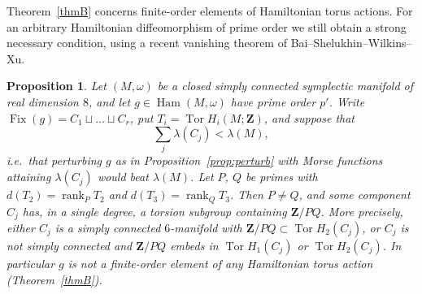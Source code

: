 \documentclass[11pt]{amsart}
\numberwithin{equation}{section}
\newtheorem{proposition}[theorem]{Proposition}
\theoremstyle{definition}
\theoremstyle{remark}
\newcommand{\Z}{\mathbf Z}
\DeclareMathOperator{\Tor}{Tor}
\DeclareMathOperator{\Fix}{Fix}
\DeclareMathOperator{\Ham}{Ham}
\DeclareMathOperator{\rank}{rank}
\begin{document}
Theorem~\ref{thmB} concerns finite-order elements of Hamiltonian torus
actions. For an arbitrary Hamiltonian diffeomorphism of prime order we
still obtain a strong necessary condition, using a recent vanishing
theorem of Bai--Shelukhin--Wilkins--Xu.

\begin{proposition}\label{prop:primeorder}
Let $(M,\omega)$ be a closed simply connected symplectic manifold of real
dimension $8$, and let $g\in\Ham(M,\omega)$ have prime order $p'$. Write
$\Fix(g)=C_1\sqcup\dots\sqcup C_r$, put $T_i=\Tor H_i(M;\Z)$, and suppose
that
\[
 \sum_j\lambda(C_j)<\lambda(M),
\]
i.e.\ that perturbing $g$ as in Proposition~\ref{prop:perturb} with
Morse functions attaining $\lambda(C_j)$ would beat $\lambda(M)$. Let $P$,
$Q$ be primes with $d(T_2)=\rank_P T_2$ and $d(T_3)=\rank_Q T_3$. Then
$P\ne Q$, and some component $C_j$ has, in a single degree, a torsion
subgroup containing $\Z/PQ$. More precisely, either $C_j$ is a simply
connected $6$-manifold with $\Z/PQ\subset\Tor H_2(C_j)$, or $C_j$ is not
simply connected and $\Z/PQ$ embeds in $\Tor H_1(C_j)$ or $\Tor H_2(C_j)$.
In particular $g$ is not a finite-order element of any Hamiltonian torus
action (Theorem~\ref{thmB}).
\end{proposition}
\end{document}
